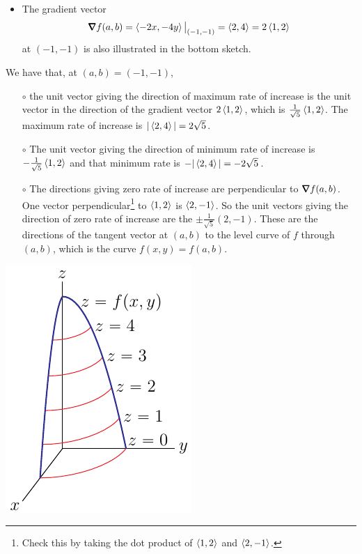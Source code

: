 \begin{eg}
\begin{itemize}
\item
The gradient vector
$$
\vnabla f(a,b)=\llt -2x,-4y\rgt \big|_{(-1,-1)}=\llt 2,4\rgt 
     =2\llt 1,2\rgt 
$$
at $(-1,-1)$ is also illustrated in the bottom sketch.
\end{itemize}
We have that, at $(a,b)=(-1,-1)$, 
\begin{itemize}
\item[$\circ$] 
the unit vector giving the direction of maximum rate of increase is 
the unit vector in the direction of the gradient vector $2\left< 1,2\right>$, 
which is $\frac{1}{\sqrt{5}}\left< 1,2\right>$. 
The maximum rate of  increase is  $|\left< 2,4\right> |=2\sqrt{5}$.
\item[$\circ$] 
The unit vector giving the direction of minimum rate of increase is 
$-\frac{1}{\sqrt{5}}\left< 1,2\right> $ and that minimum rate is 
$-|\left< 2,4\right> |=-2\sqrt{5}$.
\item[$\circ$] 
The directions giving zero rate of increase are perpendicular
to $\vnabla f(a,b)$. One vector perpendicular\footnote{Check this by 
taking the dot product of $\left< 1,2\right>$ and $\left< 2,-1\right>$.} 
to $\left< 1,2\right>$ is $\left< 2,-1\right>$.  So the unit vectors giving the
direction of zero rate of increase are the  $\pm\frac{1}{\sqrt{5}}(2,-1)$. 
These are the directions of the tangent vector at $(a,b)$ to the level 
curve of $f$ through $(a,b)$, which is the curve $f(x,y)=f(a,b)$.
\end{itemize}
\begin{efig}
\begin{center}
   \includegraphics{dderivB.pdf}\qquad

\end{center}
\end{efig}
\end{eg}

